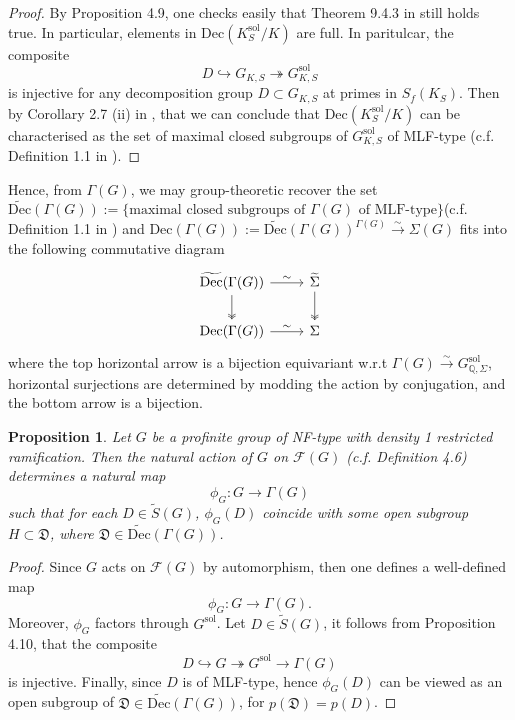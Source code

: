 \documentclass{article}
\theoremstyle{plain}
\newtheorem{prop}[thm]{Proposition}
\theoremstyle{definition}
\theoremstyle{remark}
\begin{document}
\begin{proof}
By Proposition 4.9, one checks easily that Theorem 9.4.3 in \cite{NSW} still holds true. In particular, elements in $\text{Dec}(K_S^{\text{sol}}/K)$ are full. In paritulcar, the composite
$$
D \hookrightarrow G_{K,S} \twoheadrightarrow G_{K,S}^{\text{sol}}
$$
is injective for any decomposition group $D \subset G_{K,S}$ at primes in $S_f(K_S)$. Then by Corollary 2.7 (ii) in \cite{Ivanov}, that we can conclude that $\text{Dec}(K_S^{\text{sol}}/K)$ can be characterised as the set of maximal closed subgroups of $G_{K,S}^{\text{sol}}$ of MLF-type (c.f. Definition 1.1 in \cite{Ho1}).
\end{proof}
Hence, from $\Gamma(G)$, we may group-theoretic recover the set $\widetilde{\text{Dec}}(\Gamma(G)) := \{\text{maximal closed subgroups of $\Gamma(G)$ of MLF-type}\}$(c.f. Definition 1.1 in \cite{Ho1}) and $\text{Dec}(\Gamma(G)) := \widetilde{\text{Dec}}(\Gamma(G))^{\Gamma(G)} \xrightarrow{\sim} \Sigma(G)$ fits into the following commutative diagram
$$
\begin{tikzcd}
	{\widetilde{\text{Dec}}(\Gamma(G))} & {\widetilde{\Sigma}} \\
	{\text{Dec}(\Gamma(G))} & \Sigma
	\arrow["\sim", from=1-1, to=1-2]
	\arrow[two heads, from=1-1, to=2-1]
	\arrow[two heads, from=1-2, to=2-2]
	\arrow["\sim", from=2-1, to=2-2]
\end{tikzcd}
$$
where the top horizontal arrow is a bijection equivariant w.r.t $\Gamma(G) \xrightarrow{\sim} G_{\mathbb Q,\Sigma}^{\text{sol}}$, horizontal surjections are determined by modding the action by conjugation, and the bottom arrow is a bijection.
\begin{prop}
Let $G$ be a profinite group of NF-type with density 1 restricted ramification. Then the natural action of $G$ on $\mathcal{F}(G)$ (c.f. Definition 4.6) determines a natural map
$$
\phi_G:G \to \Gamma(G)
$$
such that for each $D \in \widetilde{S}(G)$, $\phi_G(D)$ coincide with some open subgroup $H \subset \mathfrak{D}$, where $\mathfrak{D} \in \widetilde{\text{Dec}}(\Gamma(G))$.
\end{prop}
\begin{proof}
Since $G$ acts on $\mathcal{F}(G)$ by automorphism, then one defines a well-defined map
$$
\phi_G: G \to \Gamma(G).
$$
Moreover, $\phi_G$ factors through $G^{\text{sol}}$. Let $D \in \widetilde{S}(G)$, it follows from Proposition 4.10, that the composite
$$
D \hookrightarrow G \twoheadrightarrow G^{\text{sol}} \to \Gamma(G)
$$
is injective. Finally, since $D$ is of MLF-type, hence $\phi_G(D)$ can be viewed as an open subgroup of $\mathfrak{D} \in \widetilde{\text{Dec}}(\Gamma(G))$, for $p(\mathfrak{D}) = p(D)$.
\end{proof}
\end{document}
